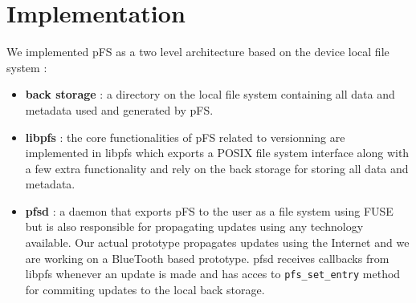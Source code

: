 
\section{Implementation}
\label{sec:impl}

We implemented pFS as a two level architecture based on the device
local file system :
\begin {itemize}
\item \textbf{back storage} : a directory on the local file system
  containing all data and metadata used and generated by pFS.
\item \textbf{libpfs} : the core functionalities of pFS related to
  versionning are implemented in libpfs which exports a POSIX file
  system interface along with a few extra functionality and rely on
  the back storage for storing all data and metadata.
\item \textbf{pfsd} : a daemon that exports pFS to the user as a file
  system using FUSE but is also responsible for propagating updates
  using any technology available. Our actual prototype propagates
  updates using the Internet and we are working on a BlueTooth based
  prototype. pfsd receives callbacks from libpfs whenever an update is
  made and has acces to {\tt pfs\_set\_entry} method for commiting
  updates to the local back storage.
\end {itemize}



